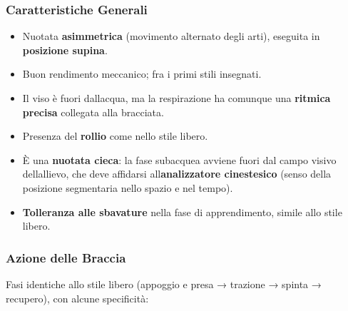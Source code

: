 \documentclass[a4paper,11pt]{article}
\providecommand{\tightlist}{%
  \setlength{\itemsep}{0pt}\setlength{\parskip}{0pt}}
\begin{document}
\subsubsection{Caratteristiche
      Generali}\label{caratteristiche-generali-1}

\begin{itemize}
      \tightlist
      \item
            Nuotata \textbf{asimmetrica} (movimento alternato degli arti),
            eseguita in \textbf{posizione supina}.
      \item
            Buon rendimento meccanico; fra i primi stili insegnati.
      \item
            Il viso è fuori dall\textquotesingle acqua, ma la respirazione ha
            comunque una \textbf{ritmica precisa} collegata alla bracciata.
      \item
            Presenza del \textbf{rollio} come nello stile libero.
      \item
            È una \textbf{nuotata cieca}: la fase subacquea avviene fuori dal
            campo visivo dell\textquotesingle allievo, che deve affidarsi
            all\textquotesingle{}\textbf{analizzatore cinestesico} (senso della
            posizione segmentaria nello spazio e nel tempo).
      \item
            \textbf{Tolleranza alle sbavature} nella fase di apprendimento, simile
            allo stile libero.
\end{itemize}

\subsubsection{Azione delle Braccia}\label{azione-delle-braccia-1}

Fasi identiche allo stile libero (appoggio e presa → trazione → spinta →
recupero), con alcune specificità:
\end{document}
